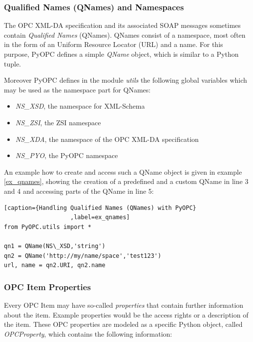 \subsubsection*{Qualified Names (QNames) and Namespaces}

The OPC XML-DA specification and its associated SOAP messages
sometimes contain {\sl Qualified Names} (QNames). QNames consist of a
namespace, most often in the form of an Uniform Resource Locator (URL)
and a name. For this purpose, PyOPC defines a simple {\sl QName}
object, which is similar to a Python tuple.

Moreover PyOPC defines in the module {\sl utils} the following global
variables which may be used as the namespace part for QNames:

\begin{itemize}
\item{\sl NS\_XSD}, the namespace for XML-Schema
\item{\sl NS\_ZSI}, the ZSI namespace
\item{\sl NS\_XDA}, the namespace of the OPC XML-DA specification
\item{\sl NS\_PYO}, the PyOPC namespace
\end{itemize}

An example how to create and access such a QName object is given
in example \ref{ex_qnames}, showing the creation of a predefined 
and a custom QName in line 3 and 4 and accessing parts of the
QName in line 5:

\lstset{language=C}
\begin{lstlisting}[caption={Handling Qualified Names (QNames) with PyOPC}
                   ,label=ex_qnames] 
from PyOPC.utils import *

qn1 = QName(NS\_XSD,'string')
qn2 = QName('http://my/name/space','test123')
url, name = qn2.URI, qn2.name
\end{lstlisting}

\subsubsection*{OPC Item Properties}

Every OPC Item may have so-called {\sl properties} that contain
further information about the item. Example properties would be the
access rights or a description of the item. These OPC properties are
modeled as a specific Python object, called {\sl OPCProperty}, which
contains the following information:

